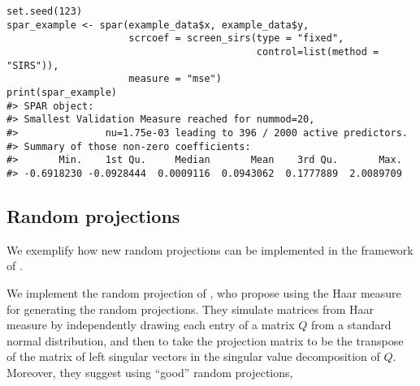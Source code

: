 \documentclass[
  article]{jss}
\begin{document}
\begin{verbatim}
set.seed(123)      
spar_example <- spar(example_data$x, example_data$y,
                     scrcoef = screen_sirs(type = "fixed",
                                           control=list(method = "SIRS")),
                     measure = "mse")
print(spar_example)
#> SPAR object:
#> Smallest Validation Measure reached for nummod=20,
#>               nu=1.75e-03 leading to 396 / 2000 active predictors.
#> Summary of those non-zero coefficients:
#>       Min.    1st Qu.     Median       Mean    3rd Qu.       Max. 
#> -0.6918230 -0.0928444  0.0009116  0.0943062  0.1777889  2.0089709
\end{verbatim}

\subsection{Random projections}\label{random-projections-1}

We exemplify how new random projections can be implemented in the
framework of .

We implement the random projection of \citet{cannings2017random}, who
propose using the Haar measure for generating the random projections.
They simulate matrices from Haar measure by independently drawing each
entry of a matrix \(Q\) from a standard normal distribution, and then to
take the projection matrix to be the transpose of the matrix of left
singular vectors in the singular value decomposition of \(Q\). Moreover,
they suggest using ``good'' random projections,
\end{document}
